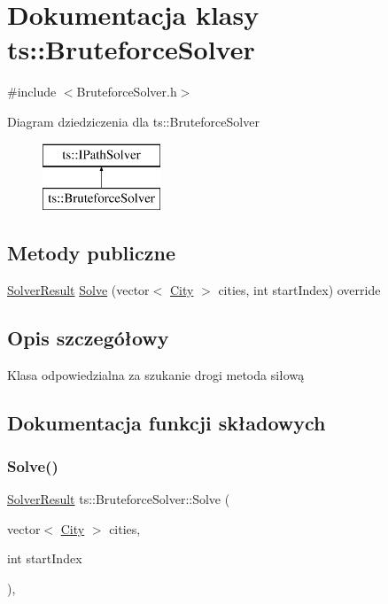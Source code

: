 \hypertarget{classts_1_1_bruteforce_solver}{}\section{Dokumentacja klasy ts\+:\+:Bruteforce\+Solver}
\label{classts_1_1_bruteforce_solver}


{\ttfamily \#include $<$Bruteforce\+Solver.\+h$>$}

Diagram dziedziczenia dla ts\+:\+:Bruteforce\+Solver\begin{figure}[H]
\begin{center}
\leavevmode
\includegraphics[height=2.000000cm]{classts_1_1_bruteforce_solver}
\end{center}
\end{figure}
\subsection*{Metody publiczne}
\begin{DoxyCompactItemize}
\item 
\mbox{\hyperlink{structts_1_1_solver_result}{Solver\+Result}} \mbox{\hyperlink{classts_1_1_bruteforce_solver_aeacf43058fd0498a2789ddcf091a42eb}{Solve}} (vector$<$ \mbox{\hyperlink{classts_1_1_city}{City}} $>$ cities, int start\+Index) override
\end{DoxyCompactItemize}


\subsection{Opis szczegółowy}
Klasa odpowiedzialna za szukanie drogi metoda siłową 

\subsection{Dokumentacja funkcji składowych}
\mbox{\label{classts_1_1_bruteforce_solver_aeacf43058fd0498a2789ddcf091a42eb}} 
\subsubsection{\texorpdfstring{Solve()}{Solve()}}
{\footnotesize\ttfamily \mbox{\hyperlink{structts_1_1_solver_result}{Solver\+Result}} ts\+::\+Bruteforce\+Solver\+::\+Solve (\begin{DoxyParamCaption}\item[{vector$<$ \mbox{\hyperlink{classts_1_1_city}{City}} $>$}]{cities,  }\item[{int}]{start\+Index }\end{DoxyParamCaption})\hspace{0.3cm}{\ttfamily [override]}, {\ttfamily [virtual]}}

